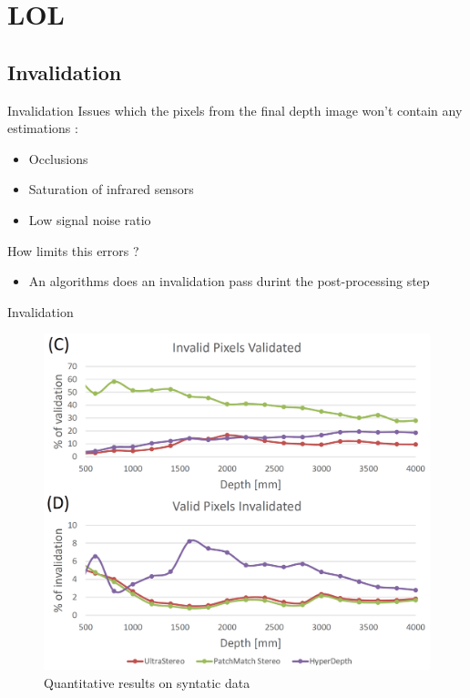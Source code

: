 %
%
\section{LOL}%
\subsection{Invalidation}
\begin{frame}{Invalidation}
Issues which the pixels from the final depth image won't contain any estimations :
\begin{itemize}
\item Occlusions
\item Saturation of infrared sensors
\item Low signal noise ratio
\end{itemize}
How limits this errors ?
\begin{itemize}
\item An algorithms does an invalidation pass durint the post-processing step
\end{itemize}
\end{frame}

\begin{frame}{Invalidation}
\begin{figure}
\includegraphics[scale=0.25]{pictures/invalidation}
\caption{Quantitative results on syntatic data}
\end{figure}
\end{frame}

